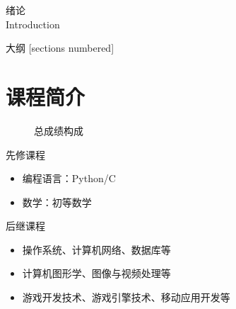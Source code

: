 \begin{standout}[第〇章]
    绪论\\
    Introduction
\end{standout}

\begin{frame}{大纲}
    [sections numbered]
    \begin{multicols}{2}
        \tableofcontents
    \end{multicols}
\end{frame}

\section{课程简介}

\begin{frame}{\insertsectionhead}
    \begin{figure}
        \centering
        \caption{总成绩构成}
        \label{fig:score_composition}
    \end{figure}
\end{frame}

\begin{frame}{\insertsectionhead}
    \begin{block}{先修课程}
        \begin{itemize}
            \item 编程语言：Python/C
            \item 数学：初等数学
        \end{itemize}
    \end{block}

    \begin{block}{后继课程}
        \begin{itemize}
            \item 操作系统、计算机网络、数据库等
            \item 计算机图形学、图像与视频处理等
            \item 游戏开发技术、游戏引擎技术、移动应用开发等
        \end{itemize}
    \end{block}
\end{frame}

